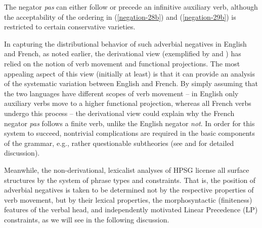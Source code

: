 \documentclass[output=paper
	        ,collection
	        ,collectionchapter
 	        ,biblatex
                ,babelshorthands
                ,newtxmath
                ,draftmode
                ,colorlinks, citecolor=brown
]{langscibook}
\begin{document}
{\begin{exe}
\begin{xlist}
\begin{exe}
\begin{xlist}
\eal
{}
 \label{negation-29b}
\zl

\noindent
The negator \textit{pas} can either follow or precede an infinitive
auxiliary verb, although the acceptability of the
ordering in (\ref{negation-28b}) and (\ref{negation-29b}) is restricted to certain conservative
varieties.

In capturing the distributional behavior of such adverbial negatives
in English and French, as noted earlier, the derivational view (exemplified by \citealt{Pollock:89} and \citealt{Chomsky:91})
has relied on the notion of verb
movement and functional projections.  The most appealing aspect of this
view (initially at least) is that it can provide an analysis of the
systematic variation
between English and French. By simply assuming that the
two languages have different scopes of verb movement -- in English
only auxiliary verbs move to a higher functional projection, whereas
all French verbs undergo this process -- the derivational
view could explain why the French negator \textit{pas} follows
a finite verb, unlike the English negator \textit{not}.  In order for this system to succeed,
nontrivial complications are required in the basic components of the
grammar, e.g., rather questionable subtheories (see \citealt[Chapter~3]{Kim:00} and \citealt{KS:02}
for detailed discussion).

Meanwhile, the non-derivational, lexicalist analyses of HPSG
license all surface structures by the system of phrase types
and constraints.  That is, the position of
adverbial negatives is taken to be determined not by
the respective properties of verb movement, but by their lexical
properties, the morphosyntactic (finiteness) features of the verbal head,
and independently motivated Linear Precedence (LP) constraints, as
we will see in the following discussion.


\end{xlist}
\end{exe}
\end{xlist}
\end{exe}}
\end{document}
